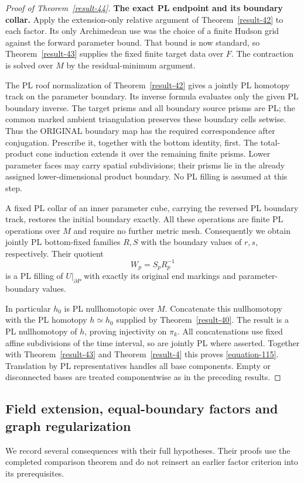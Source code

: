 \documentclass[11pt,a4paper]{article}
\theoremstyle{definition}
\begin{document}
\begin{proof}[Proof of Theorem~\ref{result-44}]
\textbf{The exact PL endpoint and its boundary collar.}\quad
Apply the extension-only relative argument of Theorem~\ref{result-42} to
each factor. Its only Archimedean use was the choice of
a finite Hudson grid against the forward parameter bound.
That bound is now standard, so Theorem~\ref{result-43} supplies the fixed
finite target data over $F$. The contraction is solved
over $M$ by the residual-minimum argument.

The PL roof normalization of Theorem~\ref{result-42} gives a jointly PL
homotopy track on the parameter boundary. Its inverse
formula evaluates only the given PL boundary inverse.
The target prisms and all boundary source prisms are PL;
the common marked ambient triangulation preserves these
boundary cells setwise. Thus the ORIGINAL boundary map
has the required correspondence after conjugation.
Prescribe it, together with the bottom identity, first.
The total-product cone induction extends it over the
remaining finite prisms. Lower parameter faces may carry
spatial subdivisions; their prisms lie in the already
assigned lower-dimensional product boundary. No PL filling
is assumed at this step.

A fixed PL collar of an inner parameter cube, carrying
the reversed PL boundary track, restores the initial
boundary exactly. All these operations are finite PL
operations over $M$ and require no further metric mesh.
Consequently we obtain jointly PL bottom-fixed families
$R,S$ with the boundary values of $r,s$, respectively.
Their quotient
\begin{equation}
 W_p=S_pR_p^{-1}
 \label{equation-117}
\end{equation}
is a PL filling of $U|_{\partial P}$ with exactly its
original end markings and parameter-boundary values.

In particular $h_0$ is PL nullhomotopic over $M$.
Concatenate this nullhomotopy with the PL homotopy
$h\simeq h_0$ supplied by Theorem~\ref{result-40}. The result is a PL
nullhomotopy of $h$, proving injectivity on $\pi_k$.
All concatenations use fixed affine subdivisions of the
time interval, so are jointly PL where asserted.
Together with Theorem~\ref{result-43} and Theorem~\ref{result-4} this proves \eqref{equation-115}.
Translation by PL representatives handles all base
components. Empty or disconnected bases are treated
componentwise as in the preceding results.
\end{proof}


\subsection{Field extension, equal-boundary factors and graph regularization}
We record several consequences with their full hypotheses. Their proofs
use the completed comparison theorem and do not reinsert an earlier
factor criterion into its prerequisites.
\end{document}
